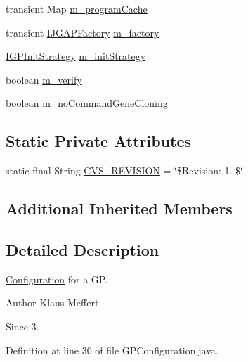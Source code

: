 \begin{DoxyCompactItemize}
\item 
transient Map \hyperlink{classorg_1_1jgap_1_1gp_1_1impl_1_1_g_p_configuration_aad38a2739615046e3bdba6b63dab534f}{m\-\_\-program\-Cache}
\item 
transient \hyperlink{interfaceorg_1_1jgap_1_1_i_j_g_a_p_factory}{I\-J\-G\-A\-P\-Factory} \hyperlink{classorg_1_1jgap_1_1gp_1_1impl_1_1_g_p_configuration_a27716ebd3d6bc8304b60127b8f87d46a}{m\-\_\-factory}
\item 
\hyperlink{interfaceorg_1_1jgap_1_1gp_1_1_i_g_p_init_strategy}{I\-G\-P\-Init\-Strategy} \hyperlink{classorg_1_1jgap_1_1gp_1_1impl_1_1_g_p_configuration_a1944f2e3debbd66e849566f0f14b885a}{m\-\_\-init\-Strategy}
\item 
boolean \hyperlink{classorg_1_1jgap_1_1gp_1_1impl_1_1_g_p_configuration_a9e44fa6879685cc29437c3adf4611d2e}{m\-\_\-verify}
\item 
boolean \hyperlink{classorg_1_1jgap_1_1gp_1_1impl_1_1_g_p_configuration_afb7d9007a6f671fe355f60380e7cac71}{m\-\_\-no\-Command\-Gene\-Cloning}
\end{DoxyCompactItemize}
\subsection*{Static Private Attributes}
\begin{DoxyCompactItemize}
\item 
static final String \hyperlink{classorg_1_1jgap_1_1gp_1_1impl_1_1_g_p_configuration_a28b95f6c0de36445fc3c419b31dc8ab7}{C\-V\-S\-\_\-\-R\-E\-V\-I\-S\-I\-O\-N} = \char`\"{}\$Revision\-: 1. \$\char`\"{}
\end{DoxyCompactItemize}
\subsection*{Additional Inherited Members}


\subsection{Detailed Description}
\hyperlink{classorg_1_1jgap_1_1_configuration}{Configuration} for a G\-P.

\begin{DoxyAuthor}{Author}
Klaus Meffert 
\end{DoxyAuthor}
\begin{DoxySince}{Since}
3. 
\end{DoxySince}


Definition at line 30 of file G\-P\-Configuration.\-java.



